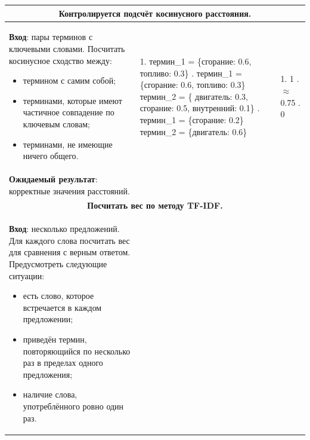 \begin{longtable}{|p{6cm}|p{5cm}|p{4.5cm}|}
	\hline
	\multicolumn{3}{|c|}{\textbf{Контролируется подсчёт косинусного расстояния.}}
	\\
	\hline
	\textbf{Вход}: пары терминов с ключевыми словами. Посчитать косинусное сходство между:
	\begin{itemize}
		\item термином с самим собой;
		\item терминами, которые имеют частичное совпадение по ключевым словам;
		\item терминами, не имеющие ничего общего.	
	\end{itemize}	
	& 1. термин\_1 = \{\newline сгорание: 0.6, \newline топливо: 0.3\} \newline \newline
	2. термин\_1 = \{\newline сгорание: 0.6, \newline топливо: 0.3\} \newline термин\_2 = \{ \newline двигатель: 0.3, \newline сгорание: 0.5, \newline внутренний: 0.1\} \newline \newline
	3. термин\_1 = \{\newline сгорание: 0.2\} \newline термин\_2 = \{\newline двигатель: 0.6\}
	
	& 1. 1 \newline \newline \newline \newline 
	2. $\approx$ 0.75 \newline \newline \newline \newline \newline \newline \newline \newline
	3. 0
	\\
	
	\textbf{Ожидаемый результат}: корректные значения расстояний. &
	&
	\\
	
	\hline
	\multicolumn{3}{|c|}{\textbf{Посчитать вес по методу TF-IDF.}}
	\\
	\hline
	\textbf{Вход}: несколько предложений. \newline
	Для каждого слова посчитать вес для сравнения с верным ответом. Предусмотреть следующие ситуации:
	\begin{itemize}
		\item есть слово, которое встречается в каждом предложении;
		\item приведён термин, повторяющийся по несколько раз в пределах одного предложения;
		\item наличие слова, употреблённого ровно один раз.	
	\end{itemize} & 


\end{longtable}
